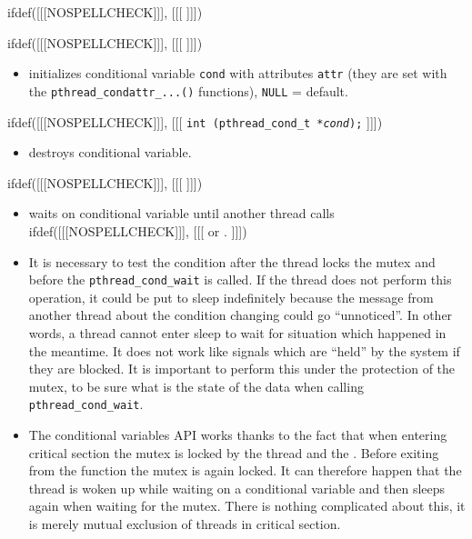 

ifdef([[[NOSPELLCHECK]]], [[[
]]])

\begin{slide}
\prgchars
ifdef([[[NOSPELLCHECK]]], [[[
]]])
\begin{itemize}
\item initializes conditional variable \texttt{cond} with attributes \texttt{attr}
(they are set with the \texttt{pthread\_condattr\_...()} functions),
\texttt{NULL} = default.
\end{itemize}
ifdef([[[NOSPELLCHECK]]], [[[
\texttt{int (pthread\_cond\_t *\emph{cond});}
]]])
\begin{itemize}
\item destroys conditional variable.
\end{itemize}
ifdef([[[NOSPELLCHECK]]], [[[
]]])
\begin{itemize}
\item waits on conditional variable until another thread calls
ifdef([[[NOSPELLCHECK]]], [[[
 or .
]]])
\end{itemize}
\end{slide}

\begin{itemize}
\item It is necessary to test the condition after the thread locks the mutex
and before the \texttt{pthread\_cond\_wait} is called. If the thread does not
perform this operation, it could be put to sleep indefinitely because the 
message from another thread about the condition changing could go ``unnoticed''.
In other words, a thread cannot enter sleep to wait for situation which happened
in the meantime. It does not work like signals which are ``held'' by the system
if they are blocked. It is important to perform this under the protection of
the mutex, to be sure what is the state of the data when calling
\texttt{pthread\_cond\_wait}.
\item The conditional variables API works thanks to the fact that when entering
critical section the mutex is locked by the thread and the
. Before exiting from the function the mutex is again
locked.
It can therefore happen that the thread is woken up while waiting on a
conditional variable and then sleeps again when waiting for the mutex.
There is nothing complicated about this, it is merely mutual exclusion of 
threads in critical section.
\end{itemize}

